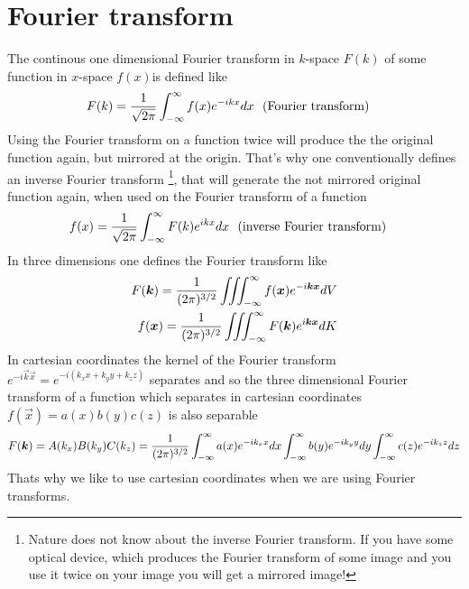 \section{Fourier transform}
The continous one dimensional Fourier transform in $k$-space $F(k)$ of some
function in
$x$-space $f(x)$is defined like
\begin{align}
F(k)&=\frac{1}{\sqrt{2\pi}}\int_{-\infty}^{\infty} f(x) e^{-ikx} dx\ \ \text{(Fourier transform)}
\end{align}
Using the Fourier transform on a function twice will produce the 
the original function again, but mirrored at the origin.
That's why one conventionally defines an inverse Fourier transform
\footnote{Nature does not know about the inverse Fourier transform.
If you have some optical device, which produces the Fourier transform
of some image and you use it twice on your image you will get a mirrored image!},
that will generate the not mirrored original function again, when used on the
Fourier transform of a function
\begin{align}
f(x)&=\frac{1}{\sqrt{2\pi}}\int_{-\infty}^{\infty} F(k) e^{ikx} dx\ \ \text{(inverse Fourier transform)}
\end{align}
In three dimensions one defines the Fourier transform like
\begin{align}
F(\boldsymbol{k})=\frac{1}{(2\pi)^{3/2}}\iiint^{\infty}_{-\infty} f(\boldsymbol{x}) e^{-i\boldsymbol{k}\boldsymbol{x}} dV \\
f(\boldsymbol{x})=\frac{1}{(2\pi)^{3/2}}\iiint^{\infty}_{-\infty} F(\boldsymbol{k}) e^{i\boldsymbol{k}\boldsymbol{x}} dK
\end{align}
In cartesian coordinates the kernel of the Fourier transform 
$e^{-i\vec{k}\vec{x}}=e^{-i(k_xx+k_yy+k_zz)}$
separates and so the three dimensional Fourier transform of a function
which separates in cartesian coordinates $f(\vec{x})=a(x)b(y)c(z)$ is 
also separable
\begin{align*}
F(\boldsymbol{k})=A(k_x)B(k_y)C(k_z)=
\frac{1}{(2\pi)^{3/2}}\int_{-\infty}^{\infty} a(x) e^{-ik_xx} dx 
\int_{-\infty}^{\infty} b(y) e^{-ik_yy} dy
\int_{-\infty}^{\infty} c(z) e^{-ik_zz} dz
\end{align*}
Thats why we like to use cartesian coordinates when we are using Fourier
transforms.
